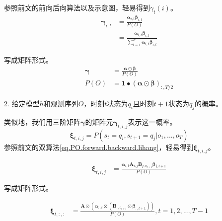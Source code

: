 \documentclass[]{article}
\begin{document}
	参照前文的前向后向算法以及示意图，轻易得到$\gamma_{t}(i)$。
	\begin{equation}
		\begin{aligned}
			\boldsymbol{\gamma}_{i,t}&= \frac{\boldsymbol{\alpha}_{i,t}\boldsymbol{\beta}_{i,t}}{P(O)} \\
			&= \frac{\boldsymbol{\alpha}_{i,t}\boldsymbol{\beta}_{i,t}}{\sum_{i=1}^{N}\boldsymbol{\alpha}_{i,t}\boldsymbol{\beta}_{i,t}}
		\end{aligned}
	\end{equation}

    写成矩阵形式。
    \begin{equation}
    	\begin{aligned}
    		\boldsymbol{\gamma}&= \frac{\boldsymbol{\alpha}\odot \boldsymbol{\beta}}{P(O)} \\
    		P(O)&=  \boldsymbol{1}\bullet(\boldsymbol{\alpha}\odot \boldsymbol{\beta})_{:,T/2}
    	\end{aligned}
    \end{equation}
    
	2. 给定模型$h$和观测序列$O$，时刻$t$状态为$q_{i}$且时刻$t+1$状态为$q_{j}$的概率。
	
	类似地，我们用三阶矩阵$\boldsymbol{\gamma}$的矩阵元$\boldsymbol{\gamma}_{t,i,j}$表示这一概率。
	\begin{equation}
		\boldsymbol{\xi}_{t,i,j}= P(s_{t}=q_{i},s_{t+1}=q_{j}|o_{1},...,o_{T})
	\end{equation}   
	参照前文的双算法\ref{eq.PO.forward.backward.lihang}，轻易得到$\boldsymbol{\xi}_{t,i,j}$。
	
	\begin{equation}
		\begin{aligned}
			\boldsymbol{\xi}_{t,i,j}&= \frac{\boldsymbol{\alpha}_{i,t}\boldsymbol{A}_{i,j}\boldsymbol{B}_{j,o_{t+1}}\boldsymbol{\beta}_{j,t+1}}{P(O)} 
		\end{aligned}
	\end{equation}

   写成矩阵形式。

	\begin{equation}
	\begin{aligned}
		\boldsymbol{\xi}_{t,:,:}&=\frac{
		\boldsymbol{A} \odot (\boldsymbol{\alpha}_{:,t} \otimes (\boldsymbol{B}_{:,o_{t+1}} \odot \boldsymbol{\beta}_{:,t+1}))}{P(O)}, t=1,2,...,T-1
	\end{aligned}
\end{equation}   
   
\end{document}
